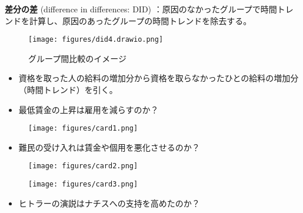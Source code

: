 \documentclass[
  xelatex,
  ja=standard]{bxjsarticle}
\providecommand{\tightlist}{%
  \setlength{\itemsep}{0pt}\setlength{\parskip}{0pt}}\usepackage{longtable,booktabs,array}
\begin{document}
\textbf{差分の差} (difference in differences: DID)
：原因のなかったグループで時間トレンドを計算し、原因のあったグループの時間トレンドを除去する。

\begin{figure}[htpb]

{\centering \texttt{[image: figures/did4.drawio.png]}

}

\caption{グループ間比較のイメージ}

\end{figure}

\begin{itemize}
\tightlist
\item
  資格を取った人の給料の増加分から資格を取らなかったひとの給料の増加分（時間トレンド）を引く。
\item
  最低賃金の上昇は雇用を減らすのか？
\end{itemize}

\begin{figure}[htpb]

{\centering \texttt{[image: figures/card1.png]}

}

\caption{\citet{card1994}}

\end{figure}

\begin{itemize}
\tightlist
\item
  難民の受け入れは賃金や個用を悪化させるのか？
\end{itemize}

\begin{figure}[htpb]

{\centering \texttt{[image: figures/card2.png]}

}

\caption{\citet{card1990}}

\end{figure}

\begin{figure}[htpb]

{\centering \texttt{[image: figures/card3.png]}

}

\caption{\citet{card1990}}

\end{figure}

\begin{itemize}
\tightlist
\item
  ヒトラーの演説はナチスへの支持を高めたのか？
\end{itemize}
\end{document}

